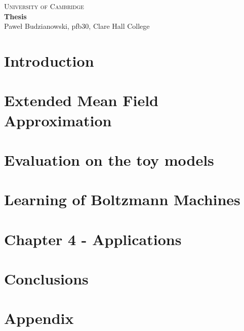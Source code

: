\documentclass[a4paper]{article}
\begin{document}
\begin{center}
\Large{\textsc{
University of Cambridge}}\\
\vspace{.5cm}
\large\textbf{Thesis}\\
\vspace{.5cm}
\large{Paweł Budzianowski, pfb30, Clare Hall College}\\
\end{center} 

\tableofcontents
\newpage

\section{Introduction}
%

\section{Extended Mean Field Approximation}


\section{Evaluation on the toy models}


\section{Learning of Boltzmann Machines}


\section{Chapter 4 - Applications}


\section{Conclusions}
%

\section{Appendix}
%


\printbibliography
\end{document}
